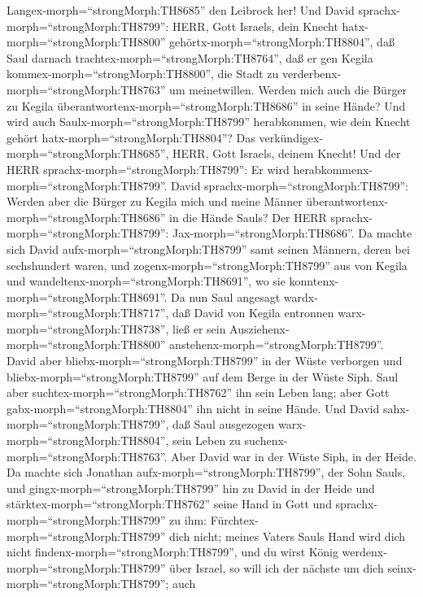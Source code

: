Langex-morph=``strongMorph:TH8685'' den Leibrock her!  Und
David sprachx-morph=``strongMorph:TH8799'': HERR, Gott Israels, dein
Knecht hatx-morph=``strongMorph:TH8800''
gehörtx-morph=``strongMorph:TH8804'', daß Saul darnach
trachtex-morph=``strongMorph:TH8764'', daß er gen Kegila
kommex-morph=``strongMorph:TH8800'', die Stadt zu
verderbenx-morph=``strongMorph:TH8763'' um meinetwillen. 
Werden mich auch die Bürger zu Kegila
überantwortenx-morph=``strongMorph:TH8686'' in seine Hände? Und wird
auch Saulx-morph=``strongMorph:TH8799'' herabkommen, wie dein Knecht
gehört hatx-morph=``strongMorph:TH8804''? Das
verkündigex-morph=``strongMorph:TH8685'', HERR, Gott Israels, deinem
Knecht! Und der HERR sprachx-morph=``strongMorph:TH8799'': Er wird
herabkommenx-morph=``strongMorph:TH8799''.  David
sprachx-morph=``strongMorph:TH8799'': Werden aber die Bürger zu Kegila
mich und meine Männer überantwortenx-morph=``strongMorph:TH8686'' in die
Hände Sauls? Der HERR sprachx-morph=``strongMorph:TH8799'':
Jax-morph=``strongMorph:TH8686''.  Da machte sich David
aufx-morph=``strongMorph:TH8799'' samt seinen Männern, deren bei
sechshundert waren, und zogenx-morph=``strongMorph:TH8799'' aus von
Kegila und wandeltenx-morph=``strongMorph:TH8691'', wo sie
konntenx-morph=``strongMorph:TH8691''. Da nun Saul angesagt
wardx-morph=``strongMorph:TH8717'', daß David von Kegila entronnen
warx-morph=``strongMorph:TH8738'', ließ er sein
Ausziehenx-morph=``strongMorph:TH8800''
anstehenx-morph=``strongMorph:TH8799''.  David aber
bliebx-morph=``strongMorph:TH8799'' in der Wüste verborgen und
bliebx-morph=``strongMorph:TH8799'' auf dem Berge in der Wüste Siph.
Saul aber suchtex-morph=``strongMorph:TH8762'' ihn sein Leben lang; aber
Gott gabx-morph=``strongMorph:TH8804'' ihn nicht in seine Hände.
 Und David sahx-morph=``strongMorph:TH8799'', daß Saul
ausgezogen warx-morph=``strongMorph:TH8804'', sein Leben zu
suchenx-morph=``strongMorph:TH8763''. Aber David war in der Wüste Siph,
in der Heide.  Da machte sich Jonathan
aufx-morph=``strongMorph:TH8799'', der Sohn Sauls, und
gingx-morph=``strongMorph:TH8799'' hin zu David in der Heide und
stärktex-morph=``strongMorph:TH8762'' seine Hand in Gott 
und sprachx-morph=``strongMorph:TH8799'' zu ihm:
Fürchtex-morph=``strongMorph:TH8799'' dich nicht; meines Vaters Sauls
Hand wird dich nicht findenx-morph=``strongMorph:TH8799'', und du wirst
König werdenx-morph=``strongMorph:TH8799'' über Israel, so will ich der
nächste um dich seinx-morph=``strongMorph:TH8799''; auch
